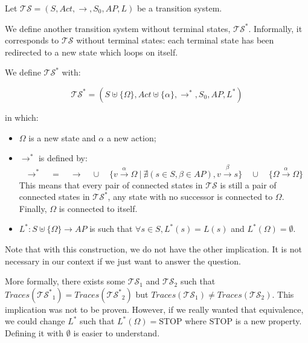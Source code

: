 \documentclass[11pt,a4paper]{article}
\def\ts{\mathcal{TS}}
\def\tss{\mathcal{TS^*}}
\def\traces{\mathit{Traces}}
\begin{document}
\begin{Answer}
\Question%
Let $\ts=(S,\mathit{Act},\rightarrow,S_0,\mathit{AP},L)$ be a transition system.

We define another transition system without terminal states, $\tss$. Informally, it corresponds to $\ts$ without terminal states: each terminal state has been redirected to a new state which loops on itself.

We define $\ts^*$ with:

$$\tss=(S\uplus\{\Omega\},\mathit{Act}\uplus\{\alpha\},\rightarrow^*,S_0,\mathit{AP},L^*)$$

in which:
\begin{itemize}
	\item $\Omega$ is a new state and $\alpha$ a new action;
	\item $\rightarrow^*$ is defined by:
		$$\rightarrow^*\quad=\quad\rightarrow\quad\cup\quad\{v\xrightarrow{\alpha} \Omega~|~\nexists (s\in S, \beta\in\mathit{AP}), v\xrightarrow{\beta}s\}\quad\cup\quad\{\Omega\xrightarrow{\alpha}\Omega\}$$%
		This means that every pair of connected states in $\mathcal{TS}$ is still a pair of connected states in $\mathcal{TS^*}$, any state with no successor is connected to $\Omega$. Finally, $\Omega$ is connected to itself.
	\item $L^* : S\uplus\{\Omega\} \to \mathit{AP}$ is such that $\forall s\in S,  L^*(s) = L(s)$ and $L^*(\Omega) = \emptyset$.
\end{itemize}

Note that with this construction, we do not have the other implication. %
It is not necessary in our context if we just want to answer the question. %

More formally, there exists some $\ts_1$ and $\ts_2$ such that $\traces(\tss_1)=\traces(\tss_2)$ but $\traces(\ts_1)\neq\traces(\ts_2)$. This implication was not to be proven. However, if we really wanted that equivalence, we could change $L^*$ such that $L^*(\Omega)=\text{STOP}$ where $\text{STOP}$ is a new property. Defining it with $\emptyset$ is easier to understand. %



\end{Answer}
\end{document}
